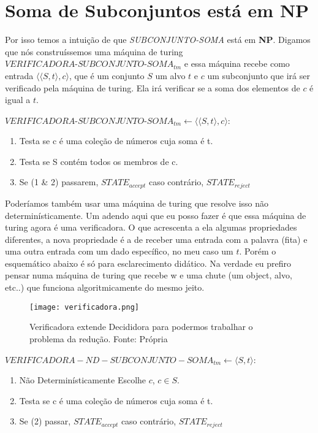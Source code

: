 \documentclass[12pt, a4paper]{article}
\begin{document}
\section{Soma de Subconjuntos está em \textbf{NP}}

Por isso temos a intuição de que \textit{SUBCONJUNTO-SOMA} está em \textbf{NP}. Digamos que nós construíssemos uma máquina de turing $\textit{VERIFICADORA-SUBCONJUNTO-SOMA}_{tm}$ e essa máquina recebe como entrada $\langle \langle S, t \rangle , c \rangle$, que é um conjunto $S$ um alvo $t$ e $c$ um subconjunto que irá ser verificado pela máquina de turing. Ela irá verificar se a soma dos elementos de $c$ é igual a $t$.

$\textit{VERIFICADORA-SUBCONJUNTO-SOMA}_{tm} \leftarrow \langle \langle S, t \rangle , c \rangle$:

\begin{enumerate}
  \item Testa se c é uma coleção de números cuja soma é t.
  \item Testa se S contém todos os membros de c.
  \item Se (1 \& 2) passarem, $STATE_{accept}$ caso  contrário, $STATE_{reject}$
\end{enumerate}

\pagebreak

Poderíamos também usar uma máquina de turing que resolve isso não determinísticamente. Um adendo aqui que eu posso fazer é que essa máquina de turing agora é uma verificadora. O que acrescenta a ela algumas propriedades diferentes, a nova propriedade é a de receber uma entrada com a palavra (fita) e uma outra entrada com um dado específico, no meu caso um $t$. Porém o esquemático abaixo é só para esclarecimento didático. Na verdade eu prefiro pensar numa máquina de turing que recebe w e uma chute (um object, alvo, etc..) que funciona algoritmicamente do mesmo jeito. \cite{sipser06}

\begin{center}
  \begin{figure}[ht]
    \texttt{[image: verificadora.png]} 
    \caption[Verificadora extende Decididora]{Verificadora extende Decididora para podermos trabalhar o problema da redução. Fonte: Própria}
  \end{figure}
\end{center}

$VERIFICADORA-ND-SUBCONJUNTO-SOMA_{tm} \leftarrow \langle S, t \rangle$:

\begin{enumerate}
  \item Não Determinísticamente Escolhe $c$, $c \in S$.
  \item Testa se c é uma coleção de números cuja soma é t.
  \item Se (2) passar, $STATE_{accept}$ caso  contrário, $STATE_{reject}$ 
\end{enumerate}
\end{document}

